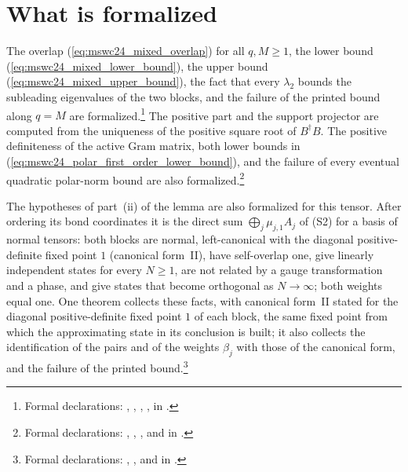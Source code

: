 \documentclass{article}
\begin{document}
\section{What is formalized}
The overlap (\ref{eq:mswc24_mixed_overlap}) for all $q,M\geq1$, the lower bound
(\ref{eq:mswc24_mixed_lower_bound}), the upper bound
(\ref{eq:mswc24_mixed_upper_bound}), the fact that every $\lambda_2$ bounds the
subleading eigenvalues of the two blocks, and the failure of the printed bound
along $q=M$ are formalized.\footnote{Formal declarations:
    ,
    ,
    ,
    ,
     in
    .} The
positive part and the support projector are computed from the uniqueness of the
positive square root of $B^\dagger B$.
The positive definiteness of the active Gram matrix, both lower bounds in
(\ref{eq:mswc24_polar_first_order_lower_bound}), and the failure of every eventual
quadratic polar-norm bound are also formalized.\footnote{Formal declarations:
    ,
    ,
    , and
     in
    .}

The hypotheses of part~(ii) of the lemma are also formalized for this tensor.
After ordering its bond coordinates it is the direct sum
$\bigoplus_j\mu_{j,1}A_j$ of (S2) for a basis of normal tensors: both blocks are
normal, left-canonical with the diagonal positive-definite fixed point $1$ (canonical
form~II), have self-overlap one, give linearly independent states for every $N\geq1$,
are not related by a gauge transformation and a phase, and give states that become
orthogonal as $N\to\infty$; both weights equal one.
One theorem collects these facts, with canonical form~II stated for the diagonal
positive-definite fixed point $1$ of each block, the same fixed point from which
the approximating state in its conclusion is built; it also collects the identification of the pairs and of the
weights $\beta_j$ with those of the canonical form, and the failure of the printed
bound.\footnote{Formal declarations:
    ,
    ,
     and
     in
    .}
\end{document}
